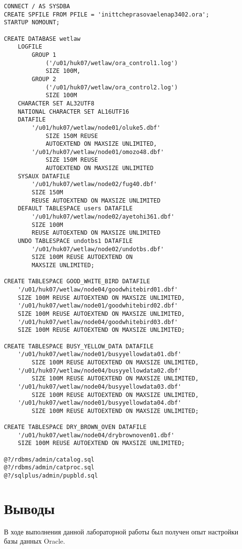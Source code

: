 \documentclass[12pt, a4paper]{article}
\begin{document}
	\begin{lstlisting}
CONNECT / AS SYSDBA
CREATE SPFILE FROM PFILE = 'inittcheprasovaelenap3402.ora';
STARTUP NOMOUNT;

CREATE DATABASE wetlaw
	LOGFILE	
		GROUP 1
			('/u01/huk07/wetlaw/ora_control1.log')	
			SIZE 100M,
		GROUP 2 
			('/u01/huk07/wetlaw/ora_control2.log')
			SIZE 100M
	CHARACTER SET AL32UTF8
	NATIONAL CHARACTER SET AL16UTF16
	DATAFILE 
		'/u01/huk07/wetlaw/node01/oluke5.dbf'
			SIZE 150M REUSE 
			AUTOEXTEND ON MAXSIZE UNLIMITED,
		'/u01/huk07/wetlaw/node01/omozo48.dbf'
			SIZE 150M REUSE 
			AUTOEXTEND ON MAXSIZE UNLIMITED
	SYSAUX DATAFILE 
		'/u01/huk07/wetlaw/node02/fug40.dbf'
		SIZE 150M 
		REUSE AUTOEXTEND ON MAXSIZE UNLIMITED
	DEFAULT TABLESPACE users DATAFILE
		'/u01/huk07/wetlaw/node02/ayetohi361.dbf'
		SIZE 100M 
		REUSE AUTOEXTEND ON MAXSIZE UNLIMITED
	UNDO TABLESPACE undotbs1 DATAFILE
		'/u01/huk07/wetlaw/node02/undotbs.dbf'
		SIZE 100M REUSE AUTOEXTEND ON
		MAXSIZE UNLIMITED;

CREATE TABLESPACE GOOD_WHITE_BIRD DATAFILE
	'/u01/huk07/wetlaw/node04/goodwhitebird01.dbf'
	SIZE 100M REUSE AUTOEXTEND ON MAXSIZE UNLIMITED,
	'/u01/huk07/wetlaw/node01/goodwhitebird02.dbf'
	SIZE 100M REUSE AUTOEXTEND ON MAXSIZE UNLIMITED,
	'/u01/huk07/wetlaw/node04/goodwhitebird03.dbf'
	SIZE 100M REUSE AUTOEXTEND ON MAXSIZE UNLIMITED;

CREATE TABLESPACE BUSY_YELLOW_DATA DATAFILE
	'/u01/huk07/wetlaw/node01/busyyellowdata01.dbf'
		SIZE 100M REUSE AUTOEXTEND ON MAXSIZE UNLIMITED,
	'/u01/huk07/wetlaw/node04/busyyellowdata02.dbf' 
		SIZE 100M REUSE AUTOEXTEND ON MAXSIZE UNLIMITED,
	'/u01/huk07/wetlaw/node04/busyyellowdata03.dbf'
		SIZE 100M REUSE AUTOEXTEND ON MAXSIZE UNLIMITED,
	'/u01/huk07/wetlaw/node01/busyyellowdata04.dbf'
		SIZE 100M REUSE AUTOEXTEND ON MAXSIZE UNLIMITED;

CREATE TABLESPACE DRY_BROWN_OVEN DATAFILE
	'/u01/huk07/wetlaw/node04/drybrownoven01.dbf' 
	SIZE 100M REUSE AUTOEXTEND ON MAXSIZE UNLIMITED;

@?/rdbms/admin/catalog.sql
@?/rdbms/admin/catproc.sql
@?/sqlplus/admin/pupbld.sql
\end{lstlisting}
	
	\section{Выводы}
	В ходе выполнения данной лабораторной работы был получен опыт настройки базы данных Oracle.
	
\end{document}
